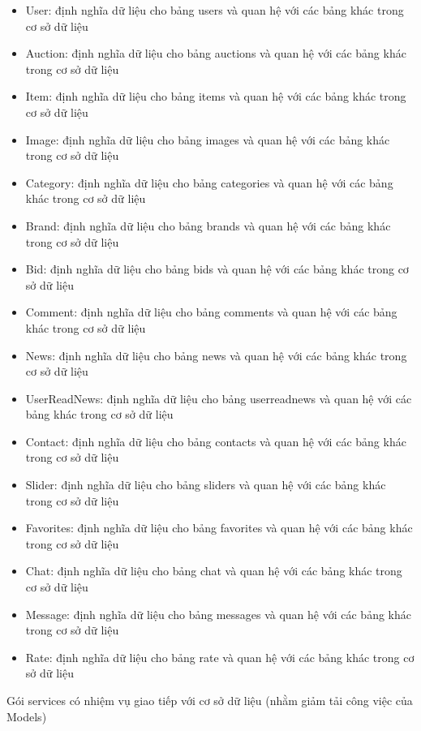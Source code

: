 \documentclass[../DoAn.tex]{subfiles}
\begin{document}
\begin{itemize}
    \item User: định nghĩa dữ liệu cho bảng users và quan hệ với các bảng khác trong cơ sở dữ liệu
    \item Auction: định nghĩa dữ liệu cho bảng auctions và quan hệ với các bảng khác trong cơ sở dữ liệu
    \item Item: định nghĩa dữ liệu cho bảng items và quan hệ với các bảng khác trong cơ sở dữ liệu
    \item Image: định nghĩa dữ liệu cho bảng images và quan hệ với các bảng khác trong cơ sở dữ liệu
    \item Category: định nghĩa dữ liệu cho bảng categories và quan hệ với các bảng khác trong cơ sở dữ liệu
    \item Brand: định nghĩa dữ liệu cho bảng brands và quan hệ với các bảng khác trong cơ sở dữ liệu
    \item Bid: định nghĩa dữ liệu cho bảng bids và quan hệ với các bảng khác trong cơ sở dữ liệu
    \item Comment: định nghĩa dữ liệu cho bảng comments và quan hệ với các bảng khác trong cơ sở dữ liệu
    \item News: định nghĩa dữ liệu cho bảng news và quan hệ với các bảng khác trong cơ sở dữ liệu
    \item UserReadNews: định nghĩa dữ liệu cho bảng userreadnews và quan hệ với các bảng khác trong cơ sở dữ liệu
    \item Contact: định nghĩa dữ liệu cho bảng contacts và quan hệ với các bảng khác trong cơ sở dữ liệu
    \item Slider: định nghĩa dữ liệu cho bảng sliders và quan hệ với các bảng khác trong cơ sở dữ liệu
    \item Favorites: định nghĩa dữ liệu cho bảng favorites và quan hệ với các bảng khác trong cơ sở dữ liệu
    \item Chat: định nghĩa dữ liệu cho bảng chat và quan hệ với các bảng khác trong cơ sở dữ liệu
    \item Message: định nghĩa dữ liệu cho bảng messages và quan hệ với các bảng khác trong cơ sở dữ liệu
    \item Rate: định nghĩa dữ liệu cho bảng rate và quan hệ với các bảng khác trong cơ sở dữ liệu
\end{itemize}
Gói services có nhiệm vụ giao tiếp với cơ sở dữ liệu (nhằm giảm tải công việc của Models)
\end{document}
